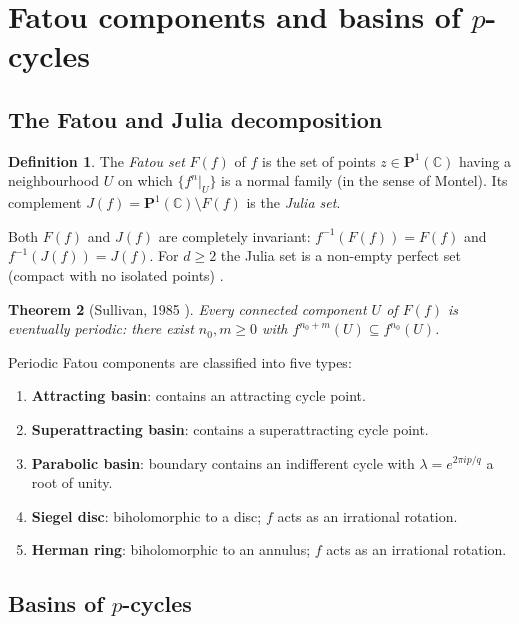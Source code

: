 \documentclass[12pt]{article}
\newtheorem{theorem}{Theorem}[section]
\theoremstyle{definition}
\newtheorem{definition}[theorem]{Definition}
\newcommand{\C}{\mathbb{C}}
\newcommand{\Pone}{\mathbf{P}^1(\C)}
\newcommand{\Ff}{F(f)}
\newcommand{\Jf}{J(f)}
\begin{document}
\section{Fatou components and basins of $p$-cycles}
\label{sec:fatou}

\subsection{The Fatou and Julia decomposition}

\begin{definition}
The \emph{Fatou set} $\Ff$ of $f$ is the set of points $z\in\Pone$
having a neighbourhood $U$ on which $\{f^n|_U\}$ is a normal family
(in the sense of Montel).  Its complement $\Jf=\Pone\setminus\Ff$ is
the \emph{Julia set}.
\end{definition}

Both $\Ff$ and $\Jf$ are completely invariant: $f^{-1}(\Ff)=\Ff$ and
$f^{-1}(\Jf)=\Jf$.  For $d\geq 2$ the Julia set is a non-empty perfect
set (compact with no isolated points) \cite{Milnor2006}.

\begin{theorem}[Sullivan, 1985 \cite{Sullivan1985}]
Every connected component $U$ of $\Ff$ is eventually periodic: there
exist $n_0,m\geq 0$ with $f^{n_0+m}(U)\subseteq f^{n_0}(U)$.
\end{theorem}

Periodic Fatou components are classified into five types:
\begin{enumerate}[label=(\roman*)]
  \item \textbf{Attracting basin}: contains an attracting cycle point.
  \item \textbf{Superattracting basin}: contains a superattracting cycle
        point.
  \item \textbf{Parabolic basin}: boundary contains an indifferent cycle
        with $\lambda=e^{2\pi i p/q}$ a root of unity.
  \item \textbf{Siegel disc}: biholomorphic to a disc; $f$ acts as an
        irrational rotation.
  \item \textbf{Herman ring}: biholomorphic to an annulus; $f$ acts as an
        irrational rotation.
\end{enumerate}

\subsection{Basins of $p$-cycles}
\end{document}
